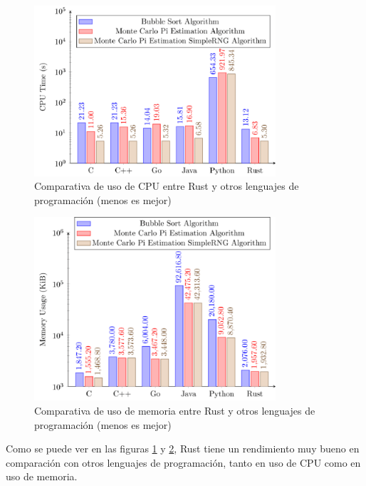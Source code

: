\begin{figure}[H]
  \centering
  \includegraphics[width=0.8\textwidth]{assets/rust-cpu-comparison.png}
  \caption{Comparativa de uso de CPU entre Rust y otros lenguajes de programación (menos es mejor) \parencite{rust-for-safety-and-performance}}
  \label{fig:rust-cpu-comparison}
\end{figure}


\begin{figure}[H]
  \centering
  \includegraphics[width=0.8\textwidth]{assets/rust-memory-comparison.png}
  \caption{Comparativa de uso de memoria entre Rust y otros lenguajes de programación (menos es mejor) \parencite{rust-for-safety-and-performance}}
  \label{fig:rust-memory-comparison}
\end{figure}

Como se puede ver en las figuras \ref{fig:rust-cpu-comparison} y \ref{fig:rust-memory-comparison}, Rust tiene un rendimiento muy bueno en comparación con otros lenguajes de programación, tanto en uso de CPU como en uso de memoria.

